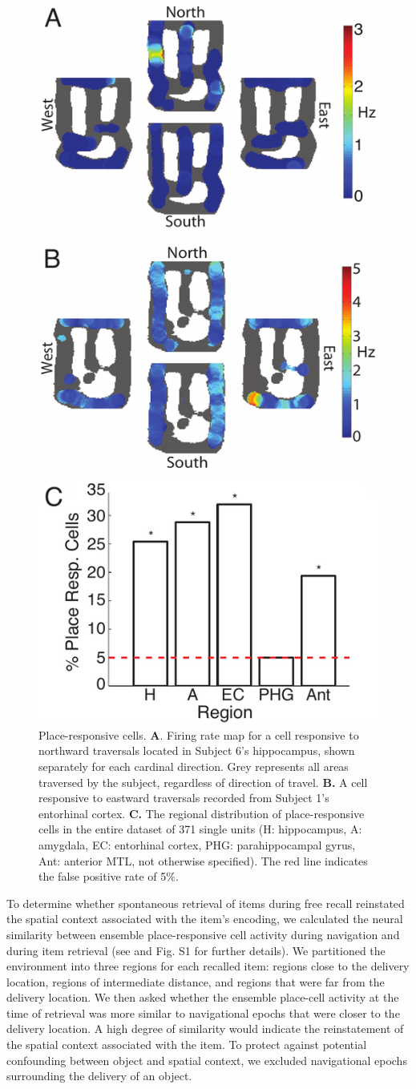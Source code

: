 \begin{figure}
\centering
    \includegraphics[width=.5\textwidth]{./tex/dboy/figs/fig2}
  \caption[Place-responsive cells]{Place-responsive cells.  \textbf{A}. Firing rate map for a cell responsive to northward traversals located in Subject 6's hippocampus, shown separately for each cardinal direction. Grey represents all areas traversed by the subject, regardless of direction of travel. \textbf{B.} A cell responsive to eastward traversals recorded from Subject 1's entorhinal cortex. \textbf{C.} The regional distribution of place-responsive cells in the entire dataset of 371 single units (H: hippocampus, A: amygdala, EC: entorhinal cortex, PHG: parahippocampal gyrus, Ant: anterior MTL, not otherwise specified).  The red line indicates the false positive rate of 5\%.}
\label{fig:place_ex}
\end{figure}

To determine whether spontaneous retrieval of items during free recall reinstated the spatial context associated with the item's encoding, we calculated the neural similarity between ensemble place-responsive cell activity during navigation and during item retrieval (see \cite{suppnote} and Fig. S1 for further details).  We partitioned the environment into three regions for each recalled item: regions close to the delivery location, regions of intermediate distance, and regions that were far from the delivery location.  We then asked whether the ensemble place-cell activity at the time of retrieval was more similar to navigational epochs that were closer to the delivery location.  A high degree of similarity would indicate the reinstatement of the spatial context associated with the item.  To protect against potential confounding between object and spatial context, we excluded navigational epochs surrounding the delivery of an object.  

